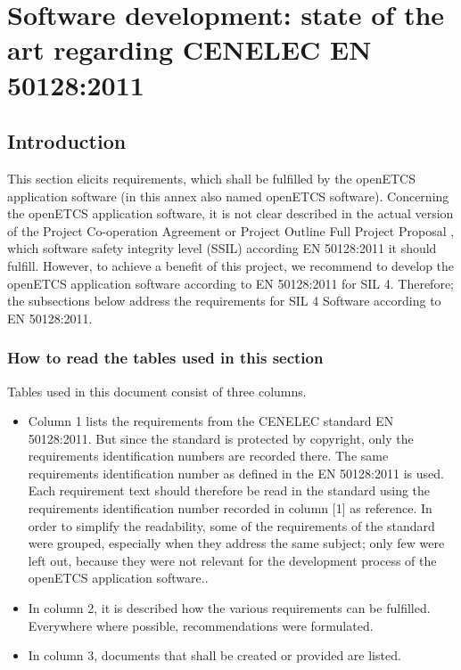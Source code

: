 \documentclass{template/openetcs_report}
\begin{document}
\chapter{Software development: state of the art regarding CENELEC EN 50128:2011}
\label{annexB}
\section{Introduction}
This section elicits requirements, which shall be fulfilled by the openETCS application software (in this annex also named openETCS software).
Concerning the openETCS application software, it is not clear described in the actual version of the Project Co-operation Agreement \cite{PCA12} or Project Outline Full Project Proposal \cite{FPP13}, which software safety integrity level (SSIL) according EN 50128:2011 it should fulfill. However, to achieve a benefit of this project, we recommend to develop the openETCS application software according to EN 50128:2011 for SIL 4. 
Therefore; the subsections below address the requirements for SIL 4 Software according to EN 50128:2011.

\subsection{How to read the tables used in this section}
Tables used in this document consist of three columns.
\begin{itemize}\itemsep=0pt
  \item Column 1 lists the requirements from the CENELEC standard EN 50128:2011. But since the standard is protected by copyright, only the requirements identification numbers are recorded there. The same requirements identification number as defined in the EN 50128:2011 is used. Each requirement text should therefore be read in the standard using the requirements identification number recorded in column [1] as reference.
In order to simplify the readability, some of the requirements of the standard were grouped, especially when they address the same subject; only few were left out, because they were not relevant for the development process of the openETCS application software..
  \item In column 2, it is described how the various requirements can be fulfilled. Everywhere where possible, recommendations were formulated.
  \item In column 3, documents that shall be created or provided are listed.
\end{itemize}
\end{document}
